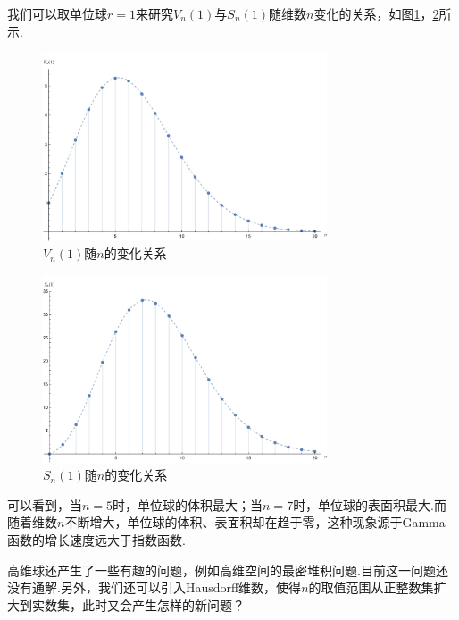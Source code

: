 	我们可以取单位球$r=1$来研究$V_n(1)$与$S_n(1)$随维数$n$变化的关系，如图\ref{fig:V_n(1)}，\ref{fig:S_n(1)}所示.
	\begin{figure}[h]
		\centering
		\includegraphics[width=0.75\textwidth]{figures/V_n(1).jpg}
		\caption{$V_n(1)$随$n$的变化关系}\label{fig:V_n(1)}
	\end{figure}

	\begin{figure}[h]
		\centering
		\includegraphics[width=0.75\textwidth]{figures/S_n(1).jpg}
		\caption{$S_n(1)$随$n$的变化关系}\label{fig:S_n(1)}
	\end{figure}
	可以看到，当$n=5$时，单位球的体积最大；当$n=7$时，单位球的表面积最大.而随着维数$n$不断增大，单位球的体积、表面积却在趋于零，这种现象源于Gamma函数的增长速度远大于指数函数.

	高维球还产生了一些有趣的问题，例如高维空间的最密堆积问题.目前这一问题还没有通解.另外，我们还可以引入Hausdorff维数，使得$n$的取值范围从正整数集扩大到实数集，此时又会产生怎样的新问题？
	
	\newpage